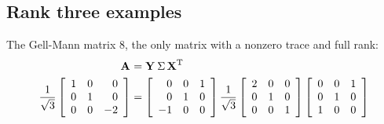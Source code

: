 \subsection{Rank three examples}
The Gell-Mann matrix 8, the only matrix with a nonzero trace and full rank:
\begin{equation}
  \begin{split}
    \textbf{A}^{\mathrm{}} & = \textbf{Y}^{\mathrm{}}\, \Sigma \, \textbf{X}^{\mathrm{ \mathrm{T} }}\\
    \frac{1}{\sqrt{3}} \left[ \begin{array}{ccr} 1 & 0 & 0 \\ 0 & 1 & 0 \\ 0 & 0 & -2 \end{array} \right]&=\left[
\begin{array}{rrr}
 0 & 0 & 1 \\
 0 & 1 & 0 \\
 -1 & 0 & 0
\end{array}
\right]
\frac{1}{\sqrt{3}}\left[
\begin{array}{ccc}
 2 & 0 & 0 \\
 0 & 1 & 0 \\
 0 & 0 & 1
\end{array}
\right]\left[
\begin{array}{ccc}
 0 & 0 & 1 \\
 0 & 1 & 0 \\
 1 & 0 & 0
\end{array}
\right]
  \end{split}
\end{equation}

